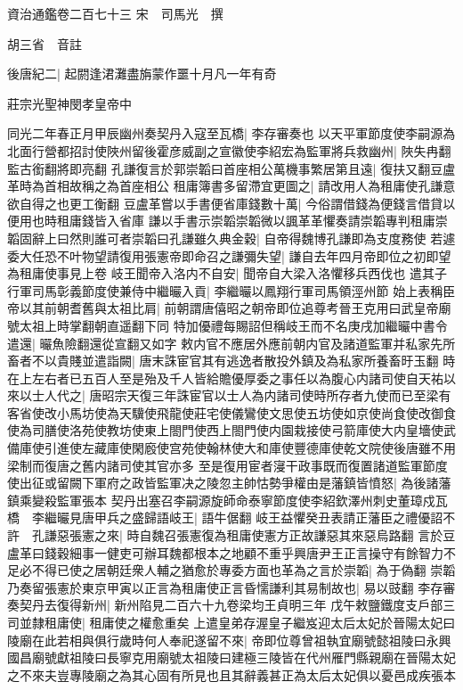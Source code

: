 資治通鑑卷二百七十三
宋　司馬光　撰

胡三省　音註

後唐紀二|{
	起閼逢涒灘盡旃蒙作噩十月凡一年有奇}


莊宗光聖神閔孝皇帝中

同光二年春正月甲辰幽州奏契丹入寇至瓦橋|{
	李存審奏也}
以天平軍節度使李嗣源為北面行營都招討使陜州留後霍彦威副之宣徽使李紹宏為監軍將兵救幽州|{
	陜失冉翻監古銜翻將即亮翻}
孔謙復言於郭崇韜曰首座相公萬機事繁居第且遠|{
	復扶又翻豆盧革時為首相故稱之為首座相公}
租庸簿書多留滯宜更圖之|{
	請改用人為租庸使孔謙意欲自得之也更工衡翻}
豆盧革嘗以手書便省庫錢數十萬|{
	今俗謂借錢為便錢言借貸以便用也時租庸錢皆入省庫}
謙以手書示崇韜崇韜微以諷革革懼奏請崇韜專判租庸崇韜固辭上曰然則誰可者崇韜曰孔謙雖久典金穀|{
	自帝得魏博孔謙即為支度務使}
若遽委大任恐不叶物望請復用張憲帝即命召之謙彌失望|{
	謙自去年四月帝即位之初即望為租庸使事見上卷}
岐王聞帝入洛内不自安|{
	聞帝自大梁入洛懼移兵西伐也}
遣其子行軍司馬彰義節度使兼侍中繼曮入貢|{
	李繼曮以鳳翔行軍司馬領涇州節}
始上表稱臣帝以其前朝耆舊與太祖比肩|{
	前朝謂唐僖昭之朝帝即位追尊考晉王克用曰武皇帝廟號太祖上時掌翻朝直遥翻下同}
特加優禮每賜詔但稱岐王而不名庚戌加繼曮中書令遣還|{
	曮魚險翻還從宣翻又如字}
敕内官不應居外應前朝内官及諸道監軍并私家先所畜者不以貴賤並遣詣闕|{
	唐末誅宦官其有逃逸者散投外鎮及為私家所養畜旴玉翻}
時在上左右者已五百人至是殆及千人皆給贍優厚委之事任以為腹心内諸司使自天祐以來以士人代之|{
	唐昭宗天復三年誅宦官以士人為内諸司使時所存者九使而已至梁有客省使改小馬坊使為天驥使飛龍使莊宅使儀鸞使文思使五坊使如京使尚食使改御食使為司膳使洛苑使教坊使東上閤門使西上閤門使内園栽接使弓箭庫使大内皇墻使武備庫使引進使左藏庫使閑廏使宫苑使翰林使大和庫使豐德庫使乾文院使後唐雖不用梁制而復唐之舊内諸司使其官亦多}
至是復用宦者寖干政事既而復置諸道監軍節度使出征或留闕下軍府之政皆監軍决之陵忽主帥怙勢爭權由是藩鎮皆憤怒|{
	為後諸藩鎮乘變殺監軍張本}
契丹出塞召李嗣源旋師命泰寧節度使李紹欽澤州刺史董璋戍瓦橋　李繼曮見唐甲兵之盛歸語岐王|{
	語牛倨翻}
岐王益懼癸丑表請正藩臣之禮優詔不許　孔謙惡張憲之來|{
	時自魏召張憲復為租庸使憲方正故謙惡其來惡烏路翻}
言於豆盧革曰錢穀細事一健吏可辦耳魏都根本之地顧不重乎興唐尹王正言操守有餘智力不足必不得已使之居朝廷衆人輔之猶愈於專委方面也革為之言於崇韜|{
	為于偽翻}
崇韜乃奏留張憲於東京甲寅以正言為租庸使正言昏懦謙利其易制故也|{
	易以豉翻}
李存審奏契丹去復得新州|{
	新州陷見二百六十九卷梁均王貞明三年}
戊午敕鹽鐵度支戶部三司並隸租庸使|{
	租庸使之權愈重矣}
上遣皇弟存渥皇子繼岌迎太后太妃於晉陽太妃曰陵廟在此若相與俱行歲時何人奉祀遂留不來|{
	帝即位尊曾祖執宜廟號懿祖陵曰永興國昌廟號獻祖陵曰長寧克用廟號太祖陵曰建極三陵皆在代州雁門縣親廟在晉陽太妃之不來夫豈專陵廟之為其心固有所見也且其辭義甚正為太后太妃俱以憂邑成疾張本}

